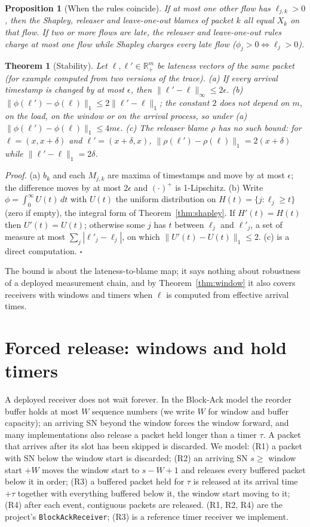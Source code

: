 \documentclass[11pt]{article}
\newtheorem{theorem}{Theorem}
\newtheorem{proposition}{Proposition}
\theoremstyle{definition}
\begin{document}
\begin{proposition}[When the rules coincide]\label{prop:coincide}
If at most one other flow has $\ell_{j,k}>0$, then the Shapley, releaser and leave-one-out blames of packet $k$ all equal $X_k$ on that flow. If two or more flows are late, the releaser and leave-one-out rules charge at most one flow while Shapley charges every late flow ($\phi_j>0\iff\ell_j>0$).
\end{proposition}

\begin{theorem}[Stability]\label{thm:stability}
Let $\ell,\ell'\in\mathbb R_+^m$ be lateness vectors of the same packet (for example computed from two versions of the trace). (a) If every arrival timestamp is changed by at most $\epsilon$, then $\|\ell'-\ell\|_\infty\le2\epsilon$. (b) $\|\phi(\ell')-\phi(\ell)\|_1\le2\|\ell'-\ell\|_1$; the constant $2$ does not depend on $m$, on the load, on the window or on the arrival process, so under (a) $\|\phi(\ell')-\phi(\ell)\|_1\le4m\epsilon$. (c) The releaser blame $\rho$ has no such bound: for $\ell=(x,x+\delta)$ and $\ell'=(x+\delta,x)$, $\|\rho(\ell')-\rho(\ell)\|_1=2(x+\delta)$ while $\|\ell'-\ell\|_1=2\delta$.
\end{theorem}
\emph{Proof.} (a) $b_k$ and each $M_{j,k}$ are maxima of timestamps and move by at most $\epsilon$; the difference moves by at most $2\epsilon$ and $(\cdot)^+$ is 1-Lipschitz. (b) Write $\phi=\int_0^\infty U(t)\,dt$ with $U(t)$ the uniform distribution on $H(t)=\{j:\ell_j\ge t\}$ (zero if empty), the integral form of Theorem~\ref{thm:shapley}. If $H'(t)=H(t)$ then $U'(t)=U(t)$; otherwise some $j$ has $t$ between $\ell_j$ and $\ell'_j$, a set of measure at most $\sum_j|\ell'_j-\ell_j|$, on which $\|U'(t)-U(t)\|_1\le2$. (c) is a direct computation. \hfill$\square$

\noindent The bound is about the lateness-to-blame map; it says nothing about robustness of a deployed measurement chain, and by Theorem~\ref{thm:window} it also covers receivers with windows and timers when $\ell$ is computed from effective arrival times.

\section{Forced release: windows and hold timers}\label{sec:forced}
A deployed receiver does not wait forever. In the Block-Ack model the reorder buffer holds at most $W$ sequence numbers (we write $W$ for window and buffer capacity); an arriving SN beyond the window forces the window forward, and many implementations also release a packet held longer than a timer $\tau$. A packet that arrives after its slot has been skipped is discarded. We model: (R1) a packet with SN below the window start is discarded; (R2) an arriving SN $s\ge$ window start $+W$ moves the window start to $s-W+1$ and releases every buffered packet below it in order; (R3) a buffered packet held for $\tau$ is released at its arrival time $+\tau$ together with everything buffered below it, the window start moving to it; (R4) after each event, contiguous packets are released. (R1, R2, R4) are the project's \texttt{BlockAckReceiver}; (R3) is a reference timer receiver we implement.
\end{document}
